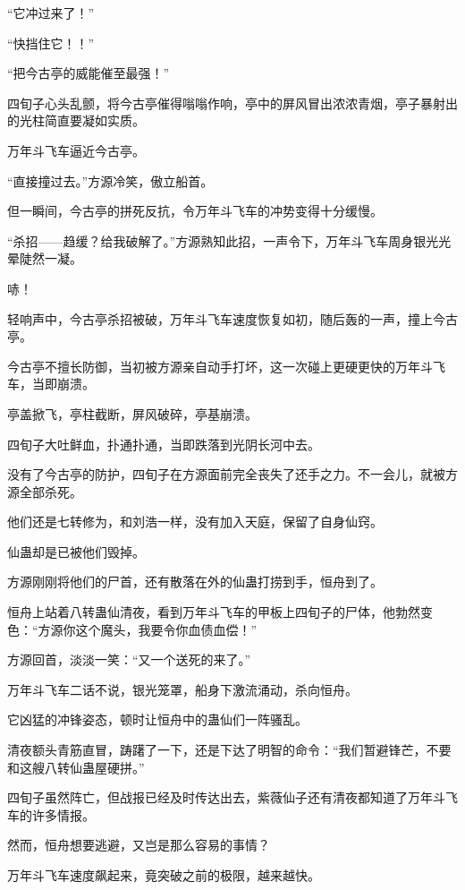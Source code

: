 
\begin{this_body}

“它冲过来了！”

“快挡住它！！”

“把今古亭的威能催至最强！”

四旬子心头乱颤，将今古亭催得嗡嗡作响，亭中的屏风冒出浓浓青烟，亭子暴射出的光柱简直要凝如实质。

万年斗飞车逼近今古亭。

“直接撞过去。”方源冷笑，傲立船首。

但一瞬间，今古亭的拼死反抗，令万年斗飞车的冲势变得十分缓慢。

“杀招——趋缓？给我破解了。”方源熟知此招，一声令下，万年斗飞车周身银光光晕陡然一凝。

哧！

轻响声中，今古亭杀招被破，万年斗飞车速度恢复如初，随后轰的一声，撞上今古亭。

今古亭不擅长防御，当初被方源亲自动手打坏，这一次碰上更硬更快的万年斗飞车，当即崩溃。

亭盖掀飞，亭柱截断，屏风破碎，亭基崩溃。

四旬子大吐鲜血，扑通扑通，当即跌落到光阴长河中去。

没有了今古亭的防护，四旬子在方源面前完全丧失了还手之力。不一会儿，就被方源全部杀死。

他们还是七转修为，和刘浩一样，没有加入天庭，保留了自身仙窍。

仙蛊却是已被他们毁掉。

方源刚刚将他们的尸首，还有散落在外的仙蛊打捞到手，恒舟到了。

恒舟上站着八转蛊仙清夜，看到万年斗飞车的甲板上四旬子的尸体，他勃然变色：“方源你这个魔头，我要令你血债血偿！”

方源回首，淡淡一笑：“又一个送死的来了。”

万年斗飞车二话不说，银光笼罩，船身下激流涌动，杀向恒舟。

它凶猛的冲锋姿态，顿时让恒舟中的蛊仙们一阵骚乱。

清夜额头青筋直冒，踌躇了一下，还是下达了明智的命令：“我们暂避锋芒，不要和这艘八转仙蛊屋硬拼。”

四旬子虽然阵亡，但战报已经及时传达出去，紫薇仙子还有清夜都知道了万年斗飞车的许多情报。

然而，恒舟想要逃避，又岂是那么容易的事情？

万年斗飞车速度飙起来，竟突破之前的极限，越来越快。


\end{this_body}
